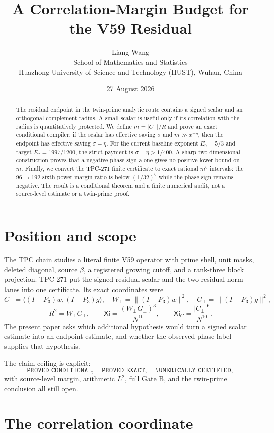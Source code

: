 \documentclass[11pt]{article}
\title{A Correlation-Margin Budget for the V59 Residual}
\author{Liang Wang\\
School of Mathematics and Statistics\\
Huazhong University of Science and Technology (HUST), Wuhan, China}
\date{27 August 2026}
\newcommand{\Cp}{C_{\perp}}
\newcommand{\Wp}{W_{\perp}}
\newcommand{\Gp}{G_{\perp}}
\newcommand{\Rtwo}{R^2}
\newcommand{\XiN}{\mathsf{Xi}}
\newcommand{\Xic}{\mathsf{Xi}_{C}}
\begin{document}
\maketitle

\begin{abstract}
The residual endpoint in the twin-prime analytic route contains a signed
scalar and an orthogonal-complement radius.  A small scalar is useful only if
its correlation with the radius is quantitatively protected.  We define
\(m=|C_{\perp}|/R\) and prove an exact conditional compiler: if the scalar has
effective saving \(\sigma\) and \(m\gg x^{-\eta}\), then the endpoint has
effective saving \(\sigma-\eta\).  For the current baseline exponent
\(E_0=5/3\) and target \(E_*=1997/1200\), the strict payment is
\(\sigma-\eta>1/400\).  A sharp two-dimensional construction proves that a
negative phase sign alone gives no positive lower bound on \(m\).  Finally,
we convert the TPC-271 finite certificate to exact rational \(m^6\) intervals:
the \(96\to192\) sixth-power margin ratio is below \((1/32)^6\) while the
phase sign remains negative.  The result is a conditional theorem and a
finite numerical audit, not a source-level estimate or a twin-prime proof.
\end{abstract}

\section{Position and scope}

The TPC chain studies a literal finite V59 operator with prime shell, unit
masks, deleted diagonal, source \(\beta\), a registered growing cutoff, and a
rank-three block projection.  TPC-271 put the signed residual scalar and the
two residual norm lanes into one certificate.  Its exact coordinates were
\[
 \Cp=\langle(I-P_3)w,(I-P_3)g\rangle,\quad
 \Wp=\|(I-P_3)w\|^2,\quad \Gp=\|(I-P_3)g\|^2,
\]
\[
 \Rtwo=\Wp\Gp,\qquad
 \XiN=\frac{(\Wp\Gp)^3}{N^{10}},\qquad
 \Xic=\frac{|\Cp|^6}{N^{10}}.
\]
The present paper asks which additional hypothesis would turn a signed
scalar estimate into an endpoint estimate, and whether the observed phase
label supplies that hypothesis.

The claim ceiling is explicit:
\[
 \texttt{PROVED\_CONDITIONAL},\quad
 \texttt{PROVED\_EXACT},\quad
 \texttt{NUMERICALLY\_CERTIFIED},
\]
with source-level margin, arithmetic \(L^2\), full Gate B, and the
twin-prime conclusion all still open.

\section{The correlation coordinate}
\end{document}
